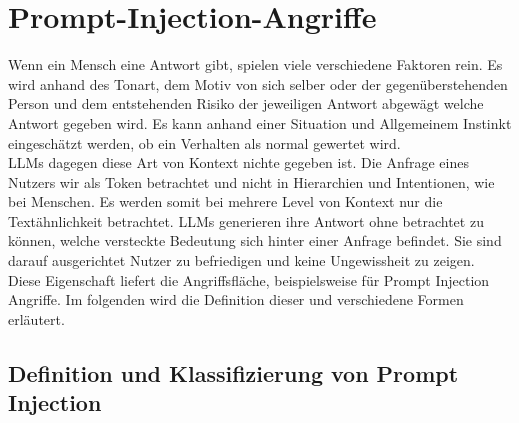 \chapter{Prompt-Injection-Angriffe}\label{ch:promptinjection}

Wenn ein Mensch eine Antwort gibt, spielen viele verschiedene Faktoren rein. Es wird anhand des Tonart, dem Motiv von
sich selber oder der gegenüberstehenden Person und dem entstehenden Risiko der jeweiligen Antwort abgewägt welche Antwort
gegeben wird. Es kann anhand einer Situation und Allgemeinem Instinkt eingeschätzt werden, ob ein Verhalten als normal
gewertet wird. \\ [17]
LLMs dagegen diese Art von Kontext nichte gegeben ist. Die Anfrage eines Nutzers wir als Token betrachtet und nicht
in Hierarchien und Intentionen, wie bei Menschen. Es werden somit bei mehrere Level von Kontext nur die Textähnlichkeit
betrachtet. LLMs generieren ihre Antwort ohne betrachtet zu können, welche versteckte Bedeutung sich hinter einer Anfrage
befindet. Sie sind darauf ausgerichtet Nutzer zu befriedigen und keine Ungewissheit zu zeigen. \\ [17]
Diese Eigenschaft liefert die Angriffsfläche, beispielsweise für Prompt Injection Angriffe. Im folgenden wird die Definition
dieser und verschiedene Formen erläutert.

\section{Definition und Klassifizierung von Prompt Injection}

